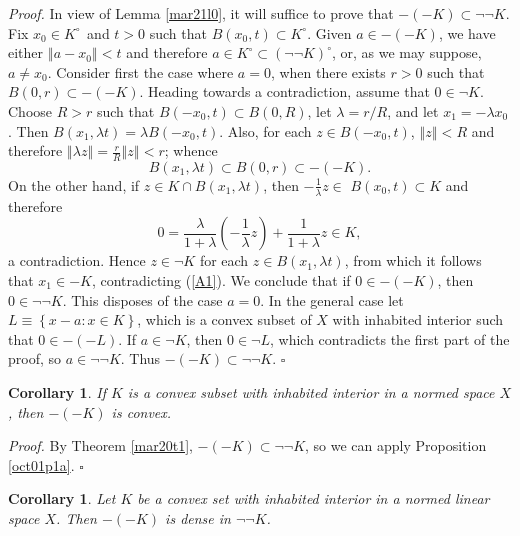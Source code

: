 \documentclass[11pt]{article}%
\newtheorem{corollary}[theorem]{Corollary}
\newenvironment{proof}[1][Proof]{\noindent\textit{#1.} }{}
\begin{document}
\begin{proof}
In view of Lemma \ref{mar21l0}, it will suffice to prove that $-(-K)\subset
\lnot\lnot K$. Fix $x_{0}\in K^{\circ\text{ }}$and $t>0$ such that
$B(x_{0},t)\subset K^{\circ}$. Given $a\in-(-K)$, we have either $\left\Vert
a-x_{0}\right\Vert <t$ and therefore $a\in K^{\circ}\subset\left(  \lnot\lnot
K\right)  ^{\circ}$, or, as we may suppose, $a\neq x_{0}$. Consider first the
case where $a=0$, when there exists $r>0$ such that $B(0,r)\subset-(-K)$.
Heading towards a contradiction, assume that $0\in\lnot K$. Choose $R>r$ such
that $B(-x_{0},t)\subset B(0,R)$, let $\lambda=r/R$, and let $x_{1}=-\lambda
x_{0}$. Then $B(x_{1},\lambda t)=\lambda B(-x_{0},t)$. Also, for each $z\in
B(-x_{0},t)$, $\left\Vert z\right\Vert <R$ and therefore $\left\Vert \lambda
z\right\Vert =\frac{r}{R}\left\Vert z\right\Vert <r$; whence%
\begin{equation}
B(x_{1},\lambda t)\subset B(0,r)\subset-(-K). \label{A1}%
\end{equation}
On the other hand, if $z\in K\cap B(x_{1},\lambda t)$, then $-\frac{1}%
{\lambda}z\in$ $B(x_{0},t)\subset K$ and therefore%
\[
0=\frac{\lambda}{1+\lambda}\left(  -\frac{1}{\lambda}z\right)  +\frac
{1}{1+\lambda}z\in K,
\]
a contradiction. Hence $z\in\lnot K$ for each $z\in B(x_{1},\lambda t)$, from
which it follows that $x_{1}\in-K$, contradicting (\ref{A1}). We conclude that
if $0\in-(-K)$, then $0\in\lnot\lnot K$. This disposes of the case $a=0$. In
the general case let $L\equiv\left\{  x-a:x\in K\right\}  $, which is a convex
subset of $X$ with inhabited interior such that $0\in-(-L)$. If $a\in\lnot K$,
then $0\in\lnot L$, which contradicts the first part of the proof, so
$a\in\lnot\lnot K$. Thus $-(-K)\subset\lnot\lnot K$.%
\hfill
$\square$
\end{proof}

\begin{corollary}
\label{oct06c2}If $K$ is a convex subset with inhabited interior in a normed
space $X$, then $-(-K)$ is convex.
\end{corollary}

\begin{proof}
By Theorem \ref{mar20t1}, $-(-K)\subset\lnot\lnot K$, so we can apply
Proposition \ref{oct01p1a}.%
\hfill
$\square$
\end{proof}

\begin{corollary}
\label{oct04c1}Let $K$ be a convex set with inhabited interior in a normed
linear space $X$. Then $-(-K)$ is dense in $\lnot\lnot K$.
\end{corollary}
\end{document}
